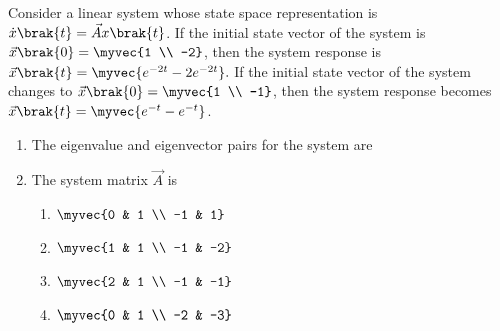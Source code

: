 %
\item  Consider a linear system whose state space representation is $\dot{x}\brak{t} = \vec{A} x\brak{t}$.
If the initial state vector of the system is $\vec{x}\brak{0} = \myvec{1 \\ -2}$, then the system response is 
$\vec{x}\brak{t} = \myvec{e^{-2t}  -2e^{-2t}}.$ 
If the initial state vector of the system changes to $\vec{x}\brak{0} = \myvec{1  \\ -1}$,
then the system response becomes $\vec{x}\brak{t} = \myvec{e^{-t}  -e^{-t}}$. 
\begin{enumerate}
\item The eigenvalue and eigenvector pairs  for the system are
\hfill{}
%
\begin{enumerate}
\end{enumerate}
% 
\item The system matrix $\vec{A}$ is  
\hfill{}
\begin{multicols}{4}
\begin{enumerate}
  \item $\myvec{0 & 1 \\ -1 & 1}$
  \item $\myvec{1 & 1 \\ -1 & -2}$
  \item $\myvec{2 & 1 \\ -1 & -1}$
  \item $\myvec{0 & 1 \\ -2 & -3}$
\end{enumerate}
\end{multicols}
\end{enumerate}

